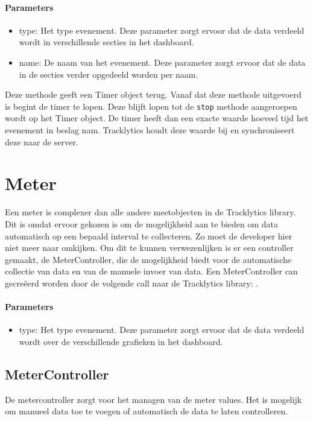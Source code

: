 \paragraph{Parameters}
\begin{itemize}
\item type: Het type evenement. Deze parameter zorgt ervoor dat de data verdeeld wordt in verschillende secties in het dashboard.
\item name: De naam van het evenement. Deze parameter zorgt ervoor dat de data in de secties verder opgedeeld worden per naam.
\end{itemize} 

Deze methode geeft een Timer object terug. Vanaf dat deze methode uitgevoerd is begint de timer te lopen. Deze blijft lopen tot de \texttt{\justify stop} methode aangeroepen wordt op het Timer object. De timer heeft dan een exacte waarde hoeveel tijd het evenement in beslag nam. Tracklytics houdt deze waarde bij en synchroniseert deze naar de server. 


\section{Meter}
Een meter is complexer dan alle andere meetobjecten in de Tracklytics library. Dit is omdat ervoor gekozen is om de mogelijkheid aan te bieden om data automatisch op een bepaald interval te collecteren. Zo moet de developer hier niet meer naar omkijken. Om dit te kunnen verwezenlijken is er een controller gemaakt, de MeterController, die de mogelijkheid biedt voor de automatische collectie van data en van de manuele invoer van data. Een MeterController can gecre\"eerd worden door de volgende call naar de Tracklytics library: \texttt{}. 

\paragraph{Parameters}
\begin{itemize}
\item type: Het type evenement. Deze parameter zorgt ervoor dat de data verdeeld wordt over de verschillende grafieken in het dashboard.
\end{itemize}

\subsection{MeterController}
De metercontroller zorgt voor het managen van de meter values. Het is mogelijk om manueel data toe te voegen of automatisch de data te laten controlleren. \\

